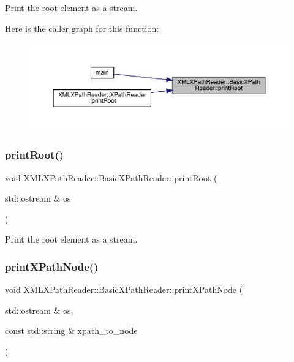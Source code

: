 Print the root element as a stream. 

Here is the caller graph for this function\+:\nopagebreak
\begin{figure}[H]
\begin{center}
\leavevmode
\includegraphics[width=350pt]{d6/dbf/classXMLXPathReader_1_1BasicXPathReader_abc0bfad898a5b01d2251d7aaacbbb507_icgraph}
\end{center}
\end{figure}
\mbox{\label{classXMLXPathReader_1_1BasicXPathReader_abc0bfad898a5b01d2251d7aaacbbb507}} 
\subsubsection{\texorpdfstring{printRoot()}{printRoot()}\hspace{0.1cm}{\footnotesize\ttfamily [2/2]}}
{\footnotesize\ttfamily void X\+M\+L\+X\+Path\+Reader\+::\+Basic\+X\+Path\+Reader\+::print\+Root (\begin{DoxyParamCaption}\item[{std\+::ostream \&}]{os }\end{DoxyParamCaption})}



Print the root element as a stream. 

\mbox{\label{classXMLXPathReader_1_1BasicXPathReader_afba694dbda7c2e1c26ca344085bfffb6}} 
\subsubsection{\texorpdfstring{printXPathNode()}{printXPathNode()}\hspace{0.1cm}{\footnotesize\ttfamily [1/2]}}
{\footnotesize\ttfamily void X\+M\+L\+X\+Path\+Reader\+::\+Basic\+X\+Path\+Reader\+::print\+X\+Path\+Node (\begin{DoxyParamCaption}\item[{std\+::ostream \&}]{os,  }\item[{const std\+::string \&}]{xpath\+\_\+to\+\_\+node }\end{DoxyParamCaption})}



